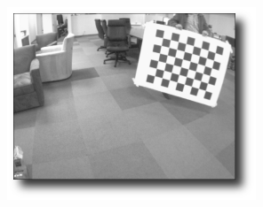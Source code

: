 \begin{figure}[H]
  \includegraphics[width=\linewidth]{Imagens/figura3-16.png}
\endminipage
\end{figure}

